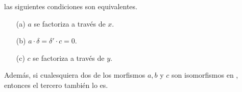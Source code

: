 \documentclass[preview]{standalone}
\begin{document}
\begin{center}
\justifying las siguientes condiciones son equivalentes. \begin{itemize} \item[(a)] $a$ se factoriza a través de $x$. \item[(b)] $a\cdot\delta = \delta'\cdot c = 0$. \item[(c)] $c$ se factoriza a través de $y$. \end{itemize}Además, si cualesquiera dos de los morfismos $a, b$ y $c$ son isomorfismos en  , entonces el tercero también lo es.
\end{center}
\end{document}
